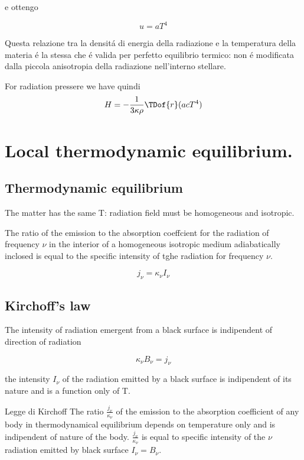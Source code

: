 e ottengo

\begin{equation*}
u=aT^4
\end{equation*}


Questa relazione tra la densit\'a di energia della radiazione e la temperatura della materia \'e la stessa che \'e valida per perfetto equilibrio termico: non \'e modificata dalla piccola anisotropia della radiazione nell'interno stellare.

For radiation pressere we have  quindi
\begin{equation*}
H=-\frac{1}{3\kappa\rho}\TDof{r}(acT^4)
\end{equation*}

\clearpage

\section{Local thermodynamic equilibrium.}


\subsection{Thermodynamic equilibrium}

The matter has the same T: radiation field must be homogeneous and isotropic.

The ratio of the emission to the absorption coeffcient for the radiation of frequency $\nu$ in the interior of a homogeneous isotropic medium adiabatically inclosed is equal to the specific intensity of tghe radiation for frequency $\nu$.

\begin{equation*}
j_{\nu}=\kappa_{\nu}I_{\nu}
\end{equation*}

\subsection{Kirchoff's law}

The intensity of radiation emergent from a black surface is indipendent of direction of radiation

\begin{equation*}
\kappa_{\nu}B_{\nu}=j_{\nu}
\end{equation*}

the intensity $I_{\nu}$ of the radiation emitted by a black surface is indipendent of its nature and is a function only of T.

\begin{usefull}{Legge di Kirchoff}
The ratio $\frac{j_{\nu}}{\kappa_{\nu}}$ of the emission to the absorption coefficient of any body in thermodynamical equilibrium depends on temperature only and is indipendent of nature of the body. $\frac{j_{\nu}}{\kappa_{\nu}}$ is equal to specific intensity of the $\nu$ radiation emitted by black surface $I_{\nu}=B_{\nu}$.
\end{usefull}

